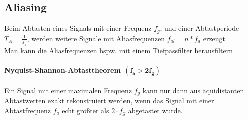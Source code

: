 \documentclass[12pt,a4paper]{article}
\begin{document}
\subsection{Aliasing}
Beim Abtasten eines Signals mit einer Frequenz $f_g$, und einer Abtastperiode $T_A = \frac{1}{f_g}$, werden weitere Signale mit Aliasfrequenzen $f_{al} = n \ast f_a$ erzeugt\\
Man kann die Aliasfrequenzen bspw. mit einem Tiefpassfilter herausfiltern\\

\paragraph{Nyquist-Shannon-Abtasttheorem $\mathbf{(f_a>2f_g)}$}
Ein Signal mit einer maximalen Frequenz $f_g$ kann nur dann aus äquidistanten Abtastwerten exakt rekonstruiert werden, wenn das Signal mit einer Abtastfrequenz $f_a$ echt größter als $2\cdot f_g$ abgetastet wurde.
\end{document}
